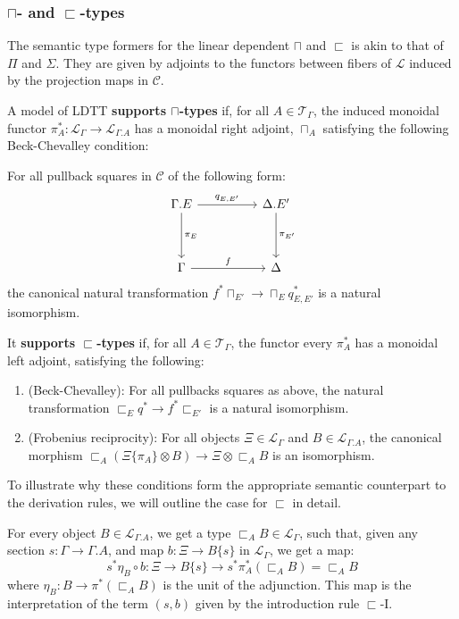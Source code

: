 \subsubsection{$\sqcap$- and $\sqsubset$-types}
The semantic type formers for the linear dependent $\sqcap$ and $\sqsubset$ is akin to that of $\Pi$ and $\Sigma$. They are given by adjoints to the functors between fibers of $\mathcal{L}$ induced by the projection maps in $\mathcal{C}$.
\begin{defn}
  A model of LDTT \textbf{supports $\sqcap$-types} if, for all $A \in \mathcal{T}_{\Gamma}$, the induced monoidal functor $\pi_A^* : \mathcal{L}_{\Gamma} \to \mathcal{L}_{\Gamma.A}$ has a monoidal right adjoint, $\sqcap_A$ satisfying the following Beck-Chevalley condition:

  
  For all pullback squares in $\mathcal{C}$ of the following form:
  \[
      \ti
    \Gamma.E \ar[d, "\pi_E"] \ar[r, "q_{E, E'}"] & \Delta.E' \ar[d, "\pi_{E'}"] \\
    \Gamma \ar[r, "f"] & \Delta
    \kz
  \]
the canonical natural transformation $f^*\sqcap_{E'} \to \sqcap_{E}q^*_{E, E'}$ is a natural isomorphism.\\
\end{defn}
\begin{defn}
  It \textbf{supports $\sqsubset$-types} if, for all $A \in \mathcal{T}_{\Gamma}$, the functor every $\pi_A^*$ has a monoidal left adjoint, satisfying the following:
  \begin{enumerate}
  \item (Beck-Chevalley): For all pullbacks squares as above, the natural transformation $\sqsubset_Eq^* \to f^*\sqsubset_{E'}$ is a natural isomorphism.
  \item (Frobenius reciprocity): For all objects $\Xi \in \mathcal{L}_{\Gamma}$ and $B \in \mathcal{L}_{\Gamma.A}$, the canonical morphism $\sqsubset_A(\Xi\{\pi_A\} \otimes B) \to \Xi \otimes \sqsubset_AB$ is an isomorphism.
  \end{enumerate}
\end{defn}
To illustrate why these conditions form the appropriate semantic counterpart to the derivation rules, we will outline the case for $\sqsubset$ in detail.


For every object $B \in \mathcal{L}_{\Gamma.A}$, we get a type $\sqsubset_AB \in \mathcal{L}_{\Gamma}$, such that, given any section $s : \Gamma \to \Gamma.A$, and map $b : \Xi \to B\{s\}$ in $\mathcal{L}_{\Gamma}$, we get a map:
\[
  s^*\eta_B \circ b : \Xi \to B\{s\} \to s^*\pi_A^*(\sqsubset_AB) = \sqsubset_AB
\]
where $\eta_B : B \to \pi^*(\sqsubset_AB)$ is the unit of the adjunction.
This map is the interpretation of the term $(s, b)$ given by the introduction rule $\sqsubset$-I.


